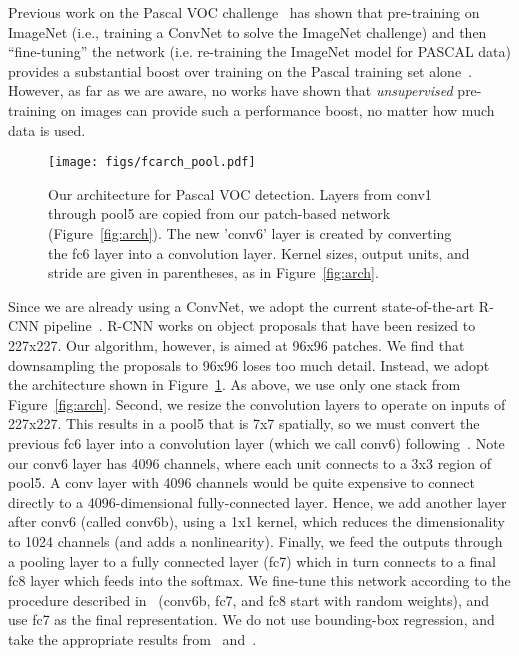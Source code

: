 \documentclass[10pt,twocolumn,letterpaper]{article}
\begin{document}
Previous work
on the Pascal VOC challenge~\cite{everingham2010pascal}
has shown that pre-training on ImageNet (i.e., training a ConvNet to solve the ImageNet challenge) and then ``fine-tuning'' the network (i.e. re-training the ImageNet model for PASCAL data) provides a substantial boost over training on the Pascal training set alone~\cite{girshick2014rich,agrawal2014analyzing}.  However, as far as we are aware, no works have shown that \textit{unsupervised} pre-training on images can provide such a performance boost, no matter how much data is used.


\begin{figure}
  \begin{minipage}[c]{0.4\linewidth}
    \texttt{[image: figs/fcarch\_pool.pdf]}
  \end{minipage}\hfill
  \begin{minipage}[c]{0.57\linewidth}
    \caption{Our architecture for Pascal VOC detection.  Layers from conv1 through pool5 are copied from our patch-based network (Figure~\ref{fig:arch}).  The new 'conv6' layer is created by converting the fc6 layer into a convolution layer.  Kernel sizes, output units, and stride are given in parentheses, as in Figure~\ref{fig:arch}.} \label{fig:fcarch}
  \end{minipage}
  \vspace{-.6cm}
\end{figure}

Since we are already using a ConvNet, we adopt the current state-of-the-art R-CNN pipeline~\cite{girshick2014rich}.  R-CNN works on object proposals that have been resized to 227x227.  Our algorithm, however, is aimed at 96x96 patches.  We find that downsampling the proposals to 96x96 loses too much detail.
Instead, we adopt the architecture shown in Figure~\ref{fig:fcarch}.  As above, we use only one stack from Figure~\ref{fig:arch}.
Second, we resize the convolution layers to operate on inputs of 227x227.  This results in a pool5 that is 7x7 spatially, so we must convert the previous fc6 layer into a convolution layer  (which we call conv6) following~\cite{long2014fully}.  Note our conv6 layer has 4096 channels, where each unit connects to a 3x3 region of pool5.  A conv layer with 4096 channels would be quite expensive to connect directly to a 4096-dimensional fully-connected layer.  Hence, we add another layer after conv6 (called conv6b), using a 1x1 kernel, which reduces the dimensionality to 1024 channels (and adds a nonlinearity).   Finally, we feed the outputs through a pooling layer to a fully connected layer (fc7) which in turn connects to a final fc8 layer which feeds into the softmax.  We fine-tune this network according to the procedure described in~\cite{girshick2014rich} (conv6b, fc7, and fc8 start with random weights), and use fc7 as the final representation.  We do not use bounding-box regression, and take the appropriate results from~\cite{girshick2014rich} and~\cite{agrawal2014analyzing}.  
\end{document}

